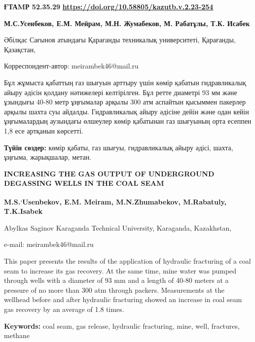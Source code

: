 \newpage
{\bfseries ҒТАMР 52.35.29}
\hfill {\bfseries \href{https://doi.org/10.58805/kazutb.v.2.23-254}{https://doi.org/10.58805/kazutb.v.2.23-254}}


\begin{center}
{\bfseries М.С.Усенбеков\envelope, Е.М. Мейрам, М.Н. Жумабеков, М. Рабатұлы, Т.К. Исабек}

Әбілқас Сағынов атындағы Қарағанды техникалық университеті, Қарағанды,
Қазақстан,

{\bfseries \envelope} Корреспондент-автор: meirambek46@mail.ru
\end{center}

Бұл жұмыста қабаттың газ шығуын арттыру үшін көмір қабатын гидравликалық
айыру әдісін қолдану нәтижелері келтірілген. Бұл ретте диаметрі 93 мм
және ұзындығы 40-80 метр ұңғымалар арқылы 300 атм аспайтын қысыммен
пакерлер арқылы шахта суы айдалды. Гидравликалық айыру әдісіне дейін
және одан кейін ұңғымалардың аузындағы өлшеулер көмір қабатынан газ
шығуының орта есеппен 1,8 есе артқанын көрсетті.

{\bfseries Түйін сөздер:} көмір қабаты, газ шығуы, гидравликалық айыру
әдісі, шахта, ұңғыма, жарықшалар, метан.

\begin{center}
{\large\bfseries INCREASING THE GAS OUTPUT OF UNDERGROUND DEGASSING WELLS IN THE
COAL SEAM}

{\bfseries M.S.\textsuperscript{.}Usenbekov\envelope, E.M.
Meiram, M.N.Zhumabekov, M.Rabatuly, T.K.Isabek}

Abylkas Saginov Karaganda Technical University, Karaganda, Kazakhstan,

e-mail: meirambek46@mail.ru
\end{center}

This paper presents the results of the application of hydraulic
fracturing of a coal seam to increase its gas recovery. At the same
time, mine water was pumped through wells with a diameter of 93 mm and a
length of 40-80 meters at a pressure of no more than 300 atm through
packers. Measurements at the wellhead before and after hydraulic
fracturing showed an increase in coal seam gas recovery by an average of
1.8 times.

{\bfseries Keywords:} coal seam, gas release, hydraulic fracturing, mine,
well, fractures, methane


